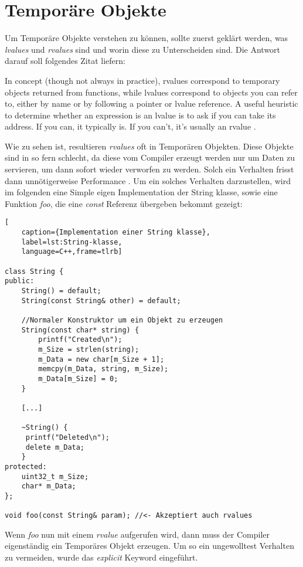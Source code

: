 \section{Temporäre Objekte}
Um Temporäre Objekte verstehen zu können, sollte zuerst geklärt werden, was \emph{lvalues} und
\emph{rvalues} sind und worin diese zu Unterscheiden sind. Die Antwort darauf soll folgendes
Zitat liefern:
\begin{zitat}
	In concept (though not always in practice), rvalues correspond to temporary
	objects returned from functions, while lvalues correspond to objects you can refer to, either by
	name or by following a pointer or lvalue reference. A useful heuristic to determine whether an
	expression is an lvalue is to ask if you can take its address. If you can, it typically is. If
	you can’t, it’s usually an rvalue \cite{EffectiveC++}.
\end{zitat}
Wie zu sehen ist, resultieren \emph{rvalues} oft in Temporären Objekten. Diese Objekte sind in so
fern schlecht, da diese vom Compiler erzeugt werden nur um Daten zu servieren, um dann sofort
wieder verworfen zu werden. Solch ein Verhalten frisst dann unnötigerweise Performance
.\cite{HandsOn}
\newline
\newline
Um ein solches Verhalten darzustellen, wird im folgenden eine Simple eigen Implementation der
String klasse, sowie eine Funktion \emph{foo}, die eine \emph{const} Referenz übergeben bekommt
gezeigt:

\begin{lstlisting}[
    caption={Implementation einer String klasse},
    label=lst:String-klasse,
    language=C++,frame=tlrb]
  				
class String {
public:
	String() = default;
	String(const String& other) = default;
	
	//Normaler Konstruktor um ein Objekt zu erzeugen
	String(const char* string) {
		printf("Created\n");
		m_Size = strlen(string);
		m_Data = new char[m_Size + 1];
		memcpy(m_Data, string, m_Size);
		m_Data[m_Size] = 0;
	}
	
	[...]
    
	~String() {
     printf("Deleted\n");
     delete m_Data;
    }
protected:
    uint32_t m_Size;
    char* m_Data;
};
				
void foo(const String& param); //<- Akzeptiert auch rvalues
\end{lstlisting}

Wenn \emph{foo} nun mit einem \emph{rvalue} aufgerufen wird, dann muss der Compiler eigenständig
ein Temporäres Objekt erzeugen. Um so ein ungewolltest Verhalten zu vermeiden, wurde das
\emph{explicit} Keyword eingeführt.